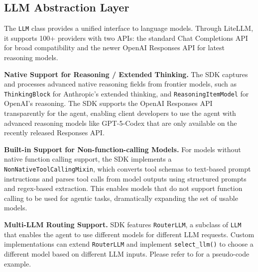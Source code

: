 \subsection{LLM Abstraction Layer}
\label{sec:llm}
The \texttt{LLM} class provides a unified interface to language models. Through LiteLLM, it supports 100+ providers with two APIs: the standard Chat Completions API for broad compatibility and the newer OpenAI Responses API for latest reasoning models.

\textbf{Native Support for Reasoning / Extended Thinking.}
The SDK captures and processes advanced native reasoning fields from frontier models, such as \texttt{ThinkingBlock} for Anthropic's extended thinking, and \texttt{ReasoningItemModel} for OpenAI's reasoning. The SDK supports the OpenAI Responses API transparently for the agent, enabling client developers to use the agent with advanced reasoning models like GPT-5-Codex that are only available on the recently released Responses API.

\textbf{Built-in Support for Non-function-calling Models.}
For models without native function calling support, the SDK implements a \texttt{NonNativeToolCallingMixin}, which converts tool schemas to text-based prompt instructions and parses tool calls from model outputs using structured prompts and regex-based extraction. This enables models that do not support function calling to be used for agentic tasks, dramatically expanding the set of usable models.

\textbf{Multi-LLM Routing Support.}
SDK features \texttt{RouterLLM}, a subclass of \texttt{LLM} that enables the agent to use different models for different LLM requests.
% 
Custom implementations can extend \texttt{RouterLLM} and implement \texttt{select\_llm()} to choose a different model based on different LLM inputs.
Please refer to  for a pseudo-code example.

